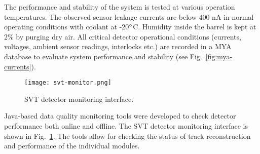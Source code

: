 The performance and stability of the system is tested at various operation temperatures. The observed sensor leakage currents are below 400 nA in normal operating conditions with coolant at -20$\degree$C. Humidity inside the barrel is kept at $2\%$ by purging dry air. All critical detector operational conditions (currents, voltages, ambient sensor readings, interlocks etc.) are recorded in a MYA database \cite{MYA} to evaluate system performance and stability (see Fig.~\ref{fig:mya-currents}).

\begin{figure}[hbt] 
\centering 
\texttt{[image: svt-monitor.png]}
\caption{SVT detector monitoring interface.}
\label{fig:svt-monitor}
\end{figure}

Java-based data quality monitoring tools were developed to check detector performance both online and offline. The SVT detector monitoring interface is shown in Fig.~\ref{fig:svt-monitor}. The tools allow for checking the status of track reconstruction and performance of the individual modules. 

